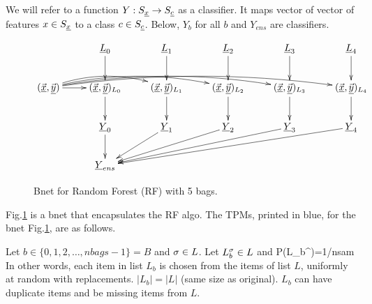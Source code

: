 We will refer to a function
$Y:S_{\underline{x}} \rightarrow S_{\underline{c}}$
as a
classifier. It maps vector
of vector of features $x\in S_{\underline{x}}$
to a class $c\in S_{\underline{c}}$. Below, 
$Y_b$ for all $b$
and $Y_{ens}$
are classifiers.


\begin{figure}
$$
\xymatrix{
&
\rvL_0\ar[d]
&
\rvL_1\ar[d]
&
\rvL_2\ar[d]
&
\rvL_3\ar[d]
&
\rvL_4\ar[d]
\\
(\vec{\rvx},\vec{\rvy})
\ar[r]
\ar@/^1pc/[rr]
\ar@/^1pc/[rrr]
\ar@/^1pc/[rrrr]
\ar@/^1pc/[rrrrr]
&
(\vec{\rvx},\vec{\rvy})_{L_0}\ar[d]
&
(\vec{\rvx},\vec{\rvy})_{L_1}\ar[d]
&
(\vec{\rvx},\vec{\rvy})_{L_2}\ar[d]
&
(\vec{\rvx},\vec{\rvy})_{L_3}\ar[d]
&
(\vec{\rvx},\vec{\rvy})_{L_4}\ar[d]
\\
&
\rvY_0\ar[d]
&
\rvY_1\ar[dl]
&
\rvY_2\ar[dll]
&
\rvY_3\ar[dlll]
&
\rvY_4\ar[dllll]
\\
&
\rvY_{ens}
}
$$
\caption{Bnet for Random Forest (RF)
with 5 bags.}
\label{fig-rf-5-bags}
\end{figure}

Fig.\ref{fig-rf-5-bags}
is a bnet that encapsulates the RF algo.
The TPMs, printed in blue, for the
bnet Fig.\ref{fig-rf-5-bags},
are as follows.


Let $b\in\{0, 1, 2, \ldots, nbags-1\}=B$
and $\sigma\in L$. Let $L^\sigma_b\in L$ and
\beq\color{blue}
P(L_b^\s)=1/nsam
\eeq
In other words, each item in list $L_b$ 
is chosen from the items of list $L$, uniformly at random
with replacements.
 $|L_b|=|L|$ (same size as original).
$L_b$ can have duplicate items and be missing
items from $L$.

